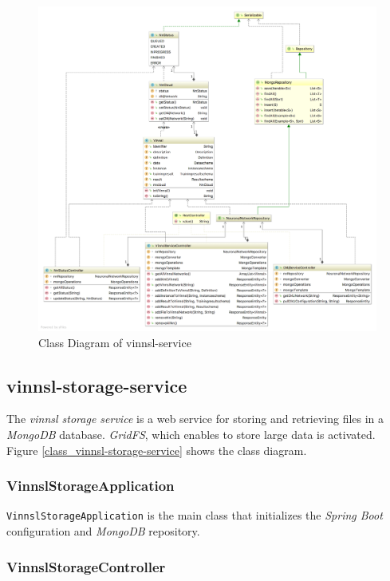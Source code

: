 \begin{figure}
\centering
\includegraphics[width=17.00000cm]{images/uml-class-diagram-vinnsl-service}
\caption{Class Diagram of vinnsl-service \label{class_vinnsl-service}}
\end{figure}

\subsection{vinnsl-storage-service}\label{vinnsl-storage-service}

The \emph{vinnsl storage service} is a web service for storing and
retrieving files in a \emph{MongoDB} database. \emph{GridFS}, which
enables to store large data is activated. Figure
\ref{class_vinnsl-storage-service} shows the class diagram.

\subsubsection{VinnslStorageApplication}\label{vinnslstorageapplication}

\texttt{VinnslStorageApplication} is the main class that initializes the
\emph{Spring Boot} configuration and \emph{MongoDB} repository.

\subsubsection{VinnslStorageController}\label{vinnslstoragecontroller}

